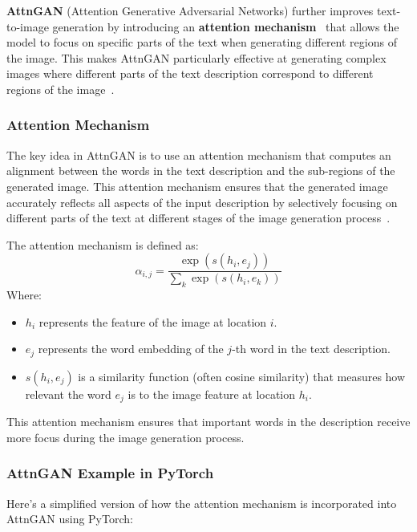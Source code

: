 \textbf{AttnGAN} (Attention Generative Adversarial Networks) further improves text-to-image generation by introducing an \textbf{attention mechanism}~\cite{vaswani2017attention} that allows the model to focus on specific parts of the text when generating different regions of the image. This makes AttnGAN particularly effective at generating complex images where different parts of the text description correspond to different regions of the image~\cite{xu2017attngan}.

\subsubsection{Attention Mechanism}

The key idea in AttnGAN is to use an attention mechanism that computes an alignment between the words in the text description and the sub-regions of the generated image. This attention mechanism ensures that the generated image accurately reflects all aspects of the input description by selectively focusing on different parts of the text at different stages of the image generation process~\cite{xu2017attngan}.

The attention mechanism is defined as:
\[
\alpha_{i,j} = \frac{\exp(s(h_i, e_j))}{\sum_{k} \exp(s(h_i, e_k))}
\]
Where:
\begin{itemize}
    \item \( h_i \) represents the feature of the image at location \(i\).
    \item \( e_j \) represents the word embedding of the \(j\)-th word in the text description.
    \item \( s(h_i, e_j) \) is a similarity function (often cosine similarity) that measures how relevant the word \(e_j\) is to the image feature at location \(h_i\).
\end{itemize}

This attention mechanism ensures that important words in the description receive more focus during the image generation process.

\subsubsection{AttnGAN Example in PyTorch}

Here's a simplified version of how the attention mechanism is incorporated into AttnGAN using PyTorch:

